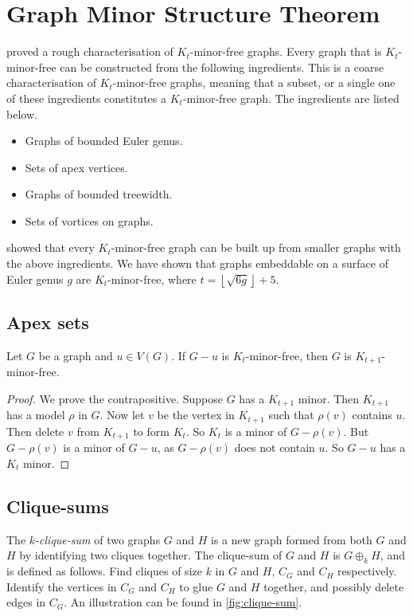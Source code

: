 \section{Graph Minor Structure Theorem}\label{sec:Kt_Minor_Free}
\textcite{robertsonGraphMinorsXVII1999} proved a rough characterisation of \(K_t\)-minor-free graphs. Every graph that is $K_t$-minor-free can be constructed from the following ingredients. This is a coarse characterisation of $K_t$-minor-free graphs, meaning that a subset, or a single one of these ingredients constitutes a $K_t$-minor-free graph. The ingredients are listed below.
\begin{itemize}
	\item Graphs of bounded Euler genus.
	\item Sets of apex vertices.
	\item Graphs of bounded treewidth.
	\item Sets of vortices on graphs.
\end{itemize}
\textcite{robertsonGraphMinorsXVII1999} showed that every \(K_t\)-minor-free graph can be built up from smaller graphs with the above ingredients. We have shown that graphs embeddable on a surface of Euler genus $g$ are $K_t$-minor-free, where $t = \left\lfloor \sqrt{6g} \right\rfloor + 5$. 

\subsection{Apex sets}\label{sssec:Apex_Vertices}

\begin{proposition}
	Let $G$ be a graph and $u \in V(G)$. If \(G-u\) is \(K_{t}\)-minor-free, then $G$ is $K_{t+1}$-minor-free. 
\end{proposition}
\begin{proof}
	We prove the contrapositive. Suppose \(G\) has a \(K_{t + 1}\) minor. Then \(K_{t + 1}\) has a model $\rho$ in \(G\). Now let \(v\) be the vertex in \(K_{t + 1}\) such that \(\rho(v)\) contains \(u\). Then delete \(v\) from \(K_{t + 1}\) to form $K_t$. So \(K_t\) is a minor of \(G - \rho(v)\). But \(G - \rho(v)\) is a minor of \(G - u\), as \(G - \rho(v)\) does not contain \(u\). So \(G - u\) has a \(K_t\) minor. 
\end{proof}
\subsection{Clique-sums}\label{sssec:Clique_Sums}
The \textit{\(k\)-clique-sum} of two graphs \(G\) and \(H\) is a new graph formed from both $G$ and $H$ by identifying two cliques together. The clique-sum of $G$ and $H$ is \(G \oplus_k H\), and is defined as follows. Find cliques of size $k$ in \(G\) and \(H\), \(C_G\) and \(C_H\) respectively. Identify the vertices in \(C_G\) and \(C_H\) to glue \(G\) and \(H\) together, and possibly delete edges in $C_G$. An illustration can be found in \cref{fig:clique-sum}. 

